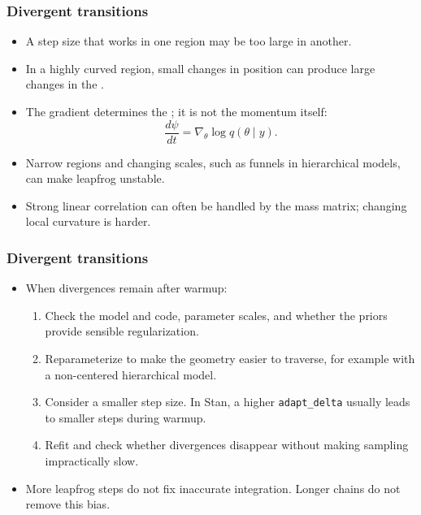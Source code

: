 \documentclass[10pt]{beamer}
\begin{document}
\begin{frame}
\frametitle{Divergent transitions}

\begin{itemize}
  \item A step size that works in one region may be too large in another.
  \item In a highly curved region, small changes in position can produce
    large changes in the .
  \pause
  \item The gradient determines the ;
    it is not the momentum itself:
    \[
    \frac{d\psi}{dt}=\nabla_\theta\log q(\theta\mid y).
    \]
  \item Narrow regions and changing scales, such as funnels in
    hierarchical models, can make leapfrog unstable.
  \item Strong linear correlation can often be handled by the mass
    matrix; changing local curvature is harder.
\end{itemize}

\end{frame}

\begin{frame}
\frametitle{Divergent transitions}

\begin{itemize}
  \item When divergences remain after warmup:
  \begin{enumerate}
    \item Check the model and code, parameter scales, and whether the
      priors provide sensible regularization.
    \pause
    \item Reparameterize to make the geometry easier to traverse,
      for example with a non-centered hierarchical model.
    \pause
    \item Consider a smaller step size. In Stan, a higher
      \texttt{adapt\_delta} usually leads to smaller steps during warmup.
    \item Refit and check whether divergences disappear without making
      sampling impractically slow.
    \end{enumerate}
  \item More leapfrog steps  do not fix
    inaccurate integration. Longer chains do not remove this bias.
\end{itemize}

\end{frame}
\end{document}
